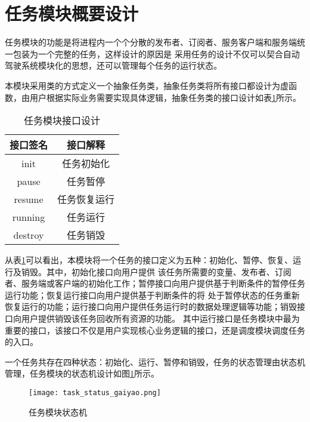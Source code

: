 \section{任务模块概要设计}
任务模块的功能是将进程内一个个分散的发布者、订阅者、服务客户端和服务端统一包装为一个完整的任务，这样设计的原因是
采用任务的设计不仅可以契合自动驾驶系统模块化的思想，还可以管理每个任务的运行状态。

本模块采用类的方式定义一个抽象任务类，抽象任务类将所有接口都设计为虚函数，由用户根据实际业务需要实现具体逻辑，抽象任务类的接口设计如表\ref{task_jiekou}所示。
\begin{table}[htb]
  \centering\small
  \caption{任务模块接口设计}
  \label{task_jiekou}
  \begin{tabular}{cc}
    \toprule
    接口签名 & 接口解释 \\
    \midrule
    init & 任务初始化 \\
    pause & 任务暂停\\
    resume & 任务恢复运行\\
    running & 任务运行\\
    destroy & 任务销毁\\
    \bottomrule
  \end{tabular}
\end{table}

从表\ref{task_jiekou}可以看出，本模块将一个任务的接口定义为五种：初始化、暂停、恢复、运行及销毁。其中，初始化接口向用户提供
该任务所需要的变量、发布者、订阅者、服务端或客户端的初始化工作；暂停接口向用户提供基于判断条件的暂停任务运行功能；恢复运行接口向用户提供基于判断条件的将
处于暂停状态的任务重新恢复运行的功能；运行接口向用户提供任务运行时的数据处理逻辑等功能；销毁接口向用户提供销毁该任务回收所有资源的功能。
其中运行接口是任务模块中最为重要的接口，该接口不仅是用户实现核心业务逻辑的接口，还是调度模块调度任务的入口。

一个任务共存在四种状态：初始化、运行、暂停和销毁，任务的状态管理由状态机管理，任务模块的状态机设计如图\ref{task_status_gaiyao}所示。
\begin{figure}[H]
  \centering
  \texttt{[image: task\_status\_gaiyao.png]}
  \caption{任务模块状态机}
  \label{task_status_gaiyao}
\end{figure}

